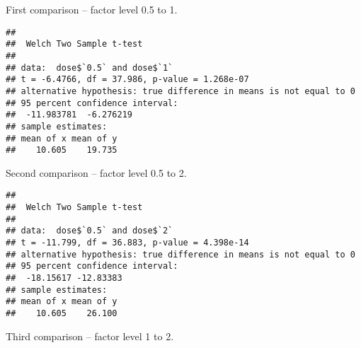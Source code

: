 \documentclass[]{article}
\newenvironment{Shaded}{\begin{snugshade}}{\end{snugshade}}
\newcommand{\KeywordTok}[1]{\textcolor[rgb]{0.13,0.29,0.53}{\textbf{{#1}}}}
\newcommand{\DataTypeTok}[1]{\textcolor[rgb]{0.13,0.29,0.53}{{#1}}}
\newcommand{\FloatTok}[1]{\textcolor[rgb]{0.00,0.00,0.81}{{#1}}}
\newcommand{\StringTok}[1]{\textcolor[rgb]{0.31,0.60,0.02}{{#1}}}
\newcommand{\NormalTok}[1]{{#1}}
\begin{document}
First comparison -- factor level 0.5 to 1.

\begin{Shaded}
\end{Shaded}

\begin{verbatim}
## 
##  Welch Two Sample t-test
## 
## data:  dose$`0.5` and dose$`1`
## t = -6.4766, df = 37.986, p-value = 1.268e-07
## alternative hypothesis: true difference in means is not equal to 0
## 95 percent confidence interval:
##  -11.983781  -6.276219
## sample estimates:
## mean of x mean of y 
##    10.605    19.735
\end{verbatim}

Second comparison -- factor level 0.5 to 2.

\begin{Shaded}
\end{Shaded}

\begin{verbatim}
## 
##  Welch Two Sample t-test
## 
## data:  dose$`0.5` and dose$`2`
## t = -11.799, df = 36.883, p-value = 4.398e-14
## alternative hypothesis: true difference in means is not equal to 0
## 95 percent confidence interval:
##  -18.15617 -12.83383
## sample estimates:
## mean of x mean of y 
##    10.605    26.100
\end{verbatim}

Third comparison -- factor level 1 to 2.

\begin{Shaded}
\end{Shaded}
\end{document}
